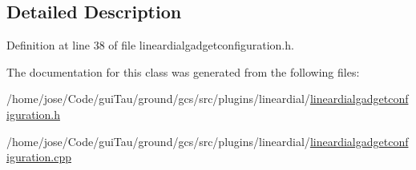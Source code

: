 \subsection{Detailed Description}


Definition at line 38 of file lineardialgadgetconfiguration.\-h.



The documentation for this class was generated from the following files\-:\begin{DoxyCompactItemize}
\item 
/home/jose/\-Code/gui\-Tau/ground/gcs/src/plugins/lineardial/\hyperlink{lineardialgadgetconfiguration_8h}{lineardialgadgetconfiguration.\-h}\item 
/home/jose/\-Code/gui\-Tau/ground/gcs/src/plugins/lineardial/\hyperlink{lineardialgadgetconfiguration_8cpp}{lineardialgadgetconfiguration.\-cpp}\end{DoxyCompactItemize}
